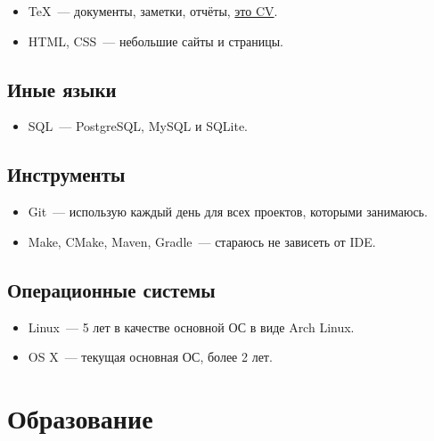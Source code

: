      \begin{itemize}

        \item \TeX~--- документы, заметки, отчёты, \href{https://github.com/ming13/cv/}{это CV}.

        \item HTML, CSS~--- небольшие сайты и страницы.

      \end{itemize}

    \subsection*{Иные языки}

      \begin{itemize}

        \item SQL~--- PostgreSQL, MySQL и SQLite.

      \end{itemize}

    \subsection*{Инструменты}

      \begin{itemize}

        \item Git~--- использую каждый день для всех проектов, которыми занимаюсь.

        \item Make, CMake, Maven, Gradle~--- стараюсь не зависеть от IDE.

      \end{itemize}

    \subsection*{Операционные системы}

      \begin{itemize}

        \item Linux~--- 5 лет в качестве основной ОС в виде Arch Linux.

        \item OS X~--- текущая основная ОС, более 2 лет.

      \end{itemize}


  \section*{Образование}

